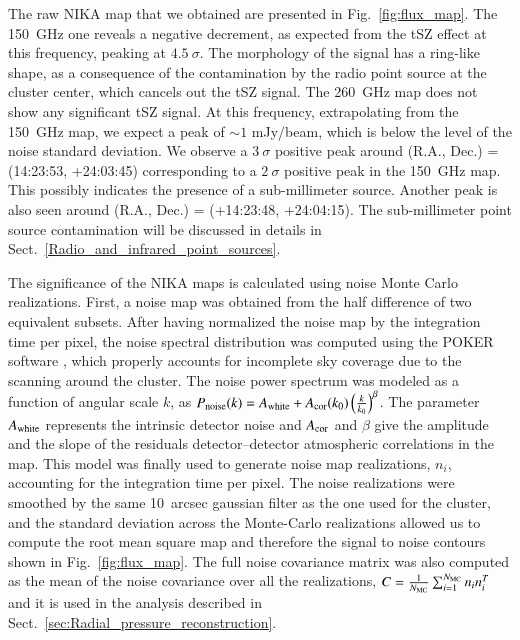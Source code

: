 \documentclass[twocolumn,traditabstract]{aa}
\begin{document}
The raw NIKA map that we obtained are presented in Fig.~\ref{fig:flux_map}. The 150~GHz one reveals a negative decrement, as expected from the tSZ effect at this frequency, peaking at $4.5 \ \sigma$. The morphology of the signal has a ring-like shape, as a consequence of the contamination by the radio point source at the cluster center, which cancels out the tSZ signal. The 260~GHz map does not show any significant tSZ signal. At this frequency, extrapolating from the 150~GHz map, we expect a peak of $\sim 1$ mJy/beam, which is below the level of the noise standard deviation. We observe a $3 \ \sigma$ positive peak around (R.A., Dec.) = (14:23:53, +24:03:45) corresponding to a $2 \ \sigma$ positive peak in the 150~GHz map. This possibly indicates the presence of a sub-millimeter source. Another peak is also seen around (R.A., Dec.) = (+14:23:48, +24:04:15). The sub-millimeter point source contamination will be discussed in details in Sect.~\ref{Radio_and_infrared_point_sources}.

The significance of the NIKA maps is calculated using noise Monte Carlo realizations. First, a noise map was obtained from the half difference of two equivalent subsets. After having normalized the noise map by the integration time per pixel, the noise spectral distribution was computed using the POKER software \citep{ponthieu2011}, which properly accounts for incomplete sky coverage due to the scanning around the cluster. The noise power spectrum was modeled as a function of angular scale $k$, as $P_{\rm noise}(k) = A_{\rm white} + A_{\rm cor}(k_0) \left(\frac{k}{k_0}\right)^{\beta}$. The parameter $A_{\rm white}$ represents the intrinsic detector noise and $A_{\rm cor}$ and $\beta$ give the amplitude and the slope of the residuals detector--detector atmospheric correlations in the map. This model was finally used to generate noise map realizations, $n_i$, accounting for the integration time per pixel. The noise realizations were smoothed by the same 10~arcsec gaussian filter as the one used for the cluster, and the standard deviation across the Monte-Carlo realizations allowed us to compute the root mean square map and therefore the signal to noise contours shown in Fig.~\ref{fig:flux_map}. The full noise covariance matrix was also computed as the mean of the noise covariance over all the realizations, $C = \frac{1}{N_{\rm MC}}\sum_{i=1}^{N_{\rm MC}}n_i n_i^{T}$ and it is used in the analysis described in Sect.~\ref{sec:Radial_pressure_reconstruction}.

\end{document}
